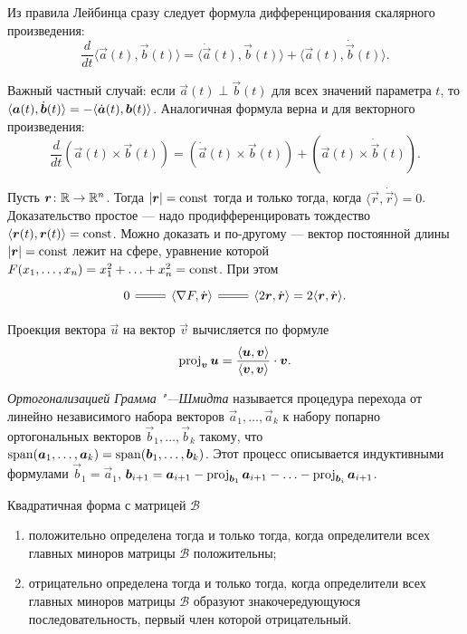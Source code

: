 Из правила Лейбинца сразу следует формула дифференцирования скалярного произведения:
\[
	\frac{d}{dt}\langle \vec{a}(t), \vec{b}(t) \rangle = \langle \dot{\vec{a}}(t), \vec{b}(t) \rangle + \langle \vec{a}(t), \dot{\vec{b}}(t) \rangle.
\]

Важный частный случай: если $\vec{a}(t) \perp \vec{b}(t)$ для всех значений параметра $t$, то $\langle\vec{a}(t), \dot{\vec{b}}(t)\rangle \hm= -\langle\dot{\vec{a}}(t), \vec{b}(t)\rangle$. Аналогичная формула верна и для векторного произведения:
\[
	\frac{d}{dt}(\vec{a}(t) \times \vec{b}(t)) = (\dot{\vec{a}}(t) \times \vec{b}(t)) + (\vec{a}(t) \times \dot{\vec{b}}(t)).
\]

Пусть $\boldsymbol{r}\colon \mathbb{R} \to \mathbb{R}^n$. Тогда $\left\lvert\boldsymbol{r}\right\rvert = \mathrm{const}$ тогда и только тогда, когда $\langle \vec{r}, \dot{\vec{r}} \rangle = 0$. Доказательство простое --- надо продифференцировать тождество $\langle \boldsymbol{r}(t), \boldsymbol{r}(t) \rangle = \mathrm{const}$. Можно доказать и по-другому --- вектор постоянной длины $\left\lvert\boldsymbol{r}\right\rvert = \mathrm{const}$ лежит на сфере, уравнение которой $F(x_1, \ldots, x_n) = x_1^2 + \ldots + x_n^2 = \mathrm{const}$. При этом
\[\begin{tikzcd}
	{0} & {\langle\nabla{F}, \dot{\vec{r}}\rangle} & {\langle 2\vec{r}, \dot{\vec{r}}\rangle = 2\langle\vec{r}, \dot{\vec{r}}\rangle}.
	\arrow[equals, from=1-2, to=1-1]
	\arrow[equals, from=1-2, to=1-3]
\end{tikzcd}\]

Проекция вектора $\vec{u}$ на вектор $\vec{v}$ вычисляется по формуле
\[
	\operatorname{proj}_{\boldsymbol{v}}\boldsymbol{u} = \frac{\langle\boldsymbol{u}, \boldsymbol{v}\rangle}{\langle\boldsymbol{v}, \boldsymbol{v}\rangle} \cdot \boldsymbol{v}.
\]

\textit{Ортогонализацией Грамма "---Шмидта} называется процедура перехода от линейно независимого набора векторов $\vec{a}_1, \ldots, \vec{a}_k$ к набору попарно ортогональных векторов $\vec{b}_1, \ldots, \vec{b}_k$ такому, что $\operatorname{span}(\boldsymbol{a}_1, \ldots, \boldsymbol{a}_k) = \operatorname{span}(\boldsymbol{b}_1, \ldots, \boldsymbol{b}_k)$. Этот процесс описывается индуктивными формулами $\vec{b}_1 = \vec{a}_1$, $\boldsymbol{b}_{i + 1} = \boldsymbol{a}_{i + 1} - \operatorname{proj}_{\boldsymbol{b}_1}\boldsymbol{a}_{i + 1} - \ldots - \operatorname{proj}_{\boldsymbol{b}_i}\boldsymbol{a}_{i + 1}$.

\begin{theorem}
	Квадратичная форма с матрицей $\mathcal{B}$
	\begin{enumerate}[nolistsep, label=(\arabic*)]
		\item положительно определена тогда и только тогда, когда определители всех главных миноров матрицы $\mathcal{B}$ положительны;
		\item отрицательно определена тогда и только тогда, когда определители всех главных миноров матрицы $\mathcal{B}$ образуют знакочередующуюся последовательность, первый член которой отрицательный.
	\end{enumerate}
\end{theorem}

